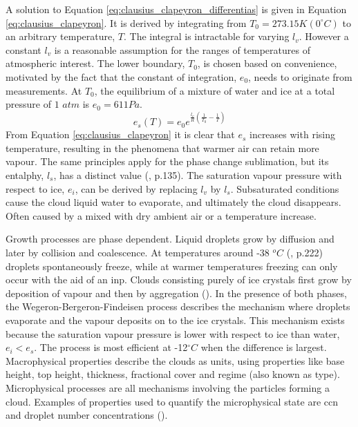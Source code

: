 A solution to Equation \eqref{eq:clausius_clapeyron_differentias} is given in Equation \eqref{eq:clausius_clapeyron}. It is derived by integrating from $T_0 = 273.15K \left(0 ^{\circ}C \right)$ to an arbitrary temperature, $T$. The integral is intractable for varying $l_v$. However a constant $l_v$ is %
a reasonable assumption for the ranges of temperatures of atmospheric interest. The lower boundary, $T_0$, is chosen based on convenience, motivated by the fact that the constant of integration,  $e_0$, needs to originate from measurements. At $T_0$, the equilibrium of a mixture of water and ice at a total pressure of $1$ $atm$ is $e_0 = 611Pa$. 
\begin{equation} \label{eq:clausius_clapeyron}
    e_s\left( T \right) = e_0 e^{\frac{l_v}{R} \left( \frac{1}{T_0} - \frac{1}{T} \right) }
\end{equation}
From Equation \eqref{eq:clausius_clapeyron} it is clear that $e_s$ increases with rising temperature, resulting in the phenomena that warmer air can retain more vapour. The same principles apply for the phase change sublimation, but its entalphy, $l_s$, has a distinct value (\cite{cloud_phys_book_johanne}, p.135). The saturation vapour pressure with respect to ice, $e_i$, can be derived by replacing $l_v$ by $l_s$. Subsaturated conditions cause the cloud liquid water to evaporate, and ultimately the cloud disappears. Often caused by a mixed with dry ambient air or a temperature increase.%

Growth processes are phase dependent. Liquid droplets grow by diffusion and later by collision and coalescence. At temperatures around -38 $^oC$ (\cite{lohmann2016}, p.222) droplets spontaneously freeze, while at warmer temperatures freezing can only occur with the aid of an  \acrshort{inp}. Clouds consisting purely of ice crystals first grow by deposition of vapour and then by aggregation (\cite{Fowler1996LiquidAssumptions}). In the presence of both phases, the Wegeron-Bergeron-Findeisen %
process describes the mechanism where droplets evaporate and the vapour deposits on to the ice crystals. %
This mechanism exists because the saturation vapour pressure is lower with respect to ice than water, $e_i < e_s$. The process is most efficient at -12$^{\circ}C$ when the difference is largest. Macrophysical properties describe the clouds as units, using properties like base height, top height, thickness, fractional cover and regime (also known as type). Microphysical processes are all mechanisms involving the particles forming a cloud. Examples of properties used to quantify the microphysical state
are \acrshort{ccn} and droplet number concentrations (\cite{Grabowski2019ModelingBetter}).

